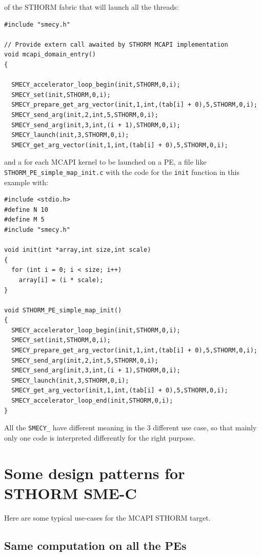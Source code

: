 \documentclass[a4paper]{article}
\begin{document}
of the STHORM fabric that will launch all the threads:
\begin{lstlisting}
#include "smecy.h"

// Provide extern call awaited by STHORM MCAPI implementation
void mcapi_domain_entry()
{

  SMECY_accelerator_loop_begin(init,STHORM,0,i);
  SMECY_set(init,STHORM,0,i);
  SMECY_prepare_get_arg_vector(init,1,int,(tab[i] + 0),5,STHORM,0,i);
  SMECY_send_arg(init,2,int,5,STHORM,0,i);
  SMECY_send_arg(init,3,int,(i + 1),STHORM,0,i);
  SMECY_launch(init,3,STHORM,0,i);
  SMECY_get_arg_vector(init,1,int,(tab[i] + 0),5,STHORM,0,i);
\end{lstlisting}
and a for each MCAPI kernel to be launched on a PE, a file like
\verb|STHORM_PE_simple_map_init.c| with the code for the \verb|init|
function in this example with:
\begin{lstlisting}
#include <stdio.h>
#define N 10
#define M 5
#include "smecy.h"

void init(int *array,int size,int scale)
{
  for (int i = 0; i < size; i++)
    array[i] = (i * scale);
}

void STHORM_PE_simple_map_init()
{
  SMECY_accelerator_loop_begin(init,STHORM,0,i);
  SMECY_set(init,STHORM,0,i);
  SMECY_prepare_get_arg_vector(init,1,int,(tab[i] + 0),5,STHORM,0,i);
  SMECY_send_arg(init,2,int,5,STHORM,0,i);
  SMECY_send_arg(init,3,int,(i + 1),STHORM,0,i);
  SMECY_launch(init,3,STHORM,0,i);
  SMECY_get_arg_vector(init,1,int,(tab[i] + 0),5,STHORM,0,i);
  SMECY_accelerator_loop_end(init,STHORM,0,i);
}
\end{lstlisting}
All the \verb|SMECY_| have different meaning in the 3 different use case,
so that mainly only one code is interpreted differently for the right
purpose.


\section{Some design patterns for STHORM SME-C}
\label{sec:examples}

Here are some typical use-cases for the MCAPI STHORM target.


\subsection{Same computation on all the PEs}
\label{sec:same-computation-all}
\end{document}
